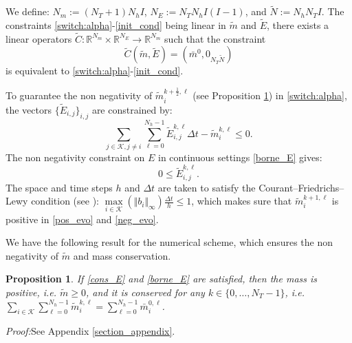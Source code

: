 \documentclass[conference]{IEEEtran}
\newtheorem{proposition}{Proposition}[section]
\def\K{\mathcal{K}}
\begin{document}
We define: $N_m := (N_T+1)N_hI$, $N_E := N_TN_hI(I-1)$, and $\tilde{N}:= N_hN_T I$.
 The constraints \eqref{switch:alpha}-\eqref{init_cond} being linear in $\tilde{m}$ and $\tilde{E}$, there exists a linear operators $\tilde{C}:\mathbb{R}^{N_m}\times \mathbb{R}^{N_E} \to \mathbb{R}^{N_m}$ such that the constraint 
 \begin{equation}
 \label{linear:cons}
 \tilde{C}(\tilde{m},\tilde{E}) = (\bar{m}^{0}, 0_{N_T\tilde{N}})
 \end{equation}
 is equivalent to \eqref{switch:alpha}-\eqref{init_cond}.

 To guarantee the non negativity of $\tilde{m}_i^{k+\frac{1}{2},\ell}$ (see Proposition \ref{prop_num_schemm})  in \eqref{switch:alpha}, the vectors $\{\tilde{E}_{i,j}\}_{i,j}$ are constrained by:
 \begin{equation}
 \label{cons_E}
 \sum_{j\in\K ,j\neq i}\sum_{\ell =0}^{N_h-1}\tilde{E}^{k,\ell}_{i,j}\Delta t-\tilde{m}^{k,\ell}_{i}\leq 0.
 \end{equation}
 The non negativity constraint on $E$ in continuous settings \eqref{borne_E} gives:
 \begin{equation}
 \label{borne_E_dis}
 0\leq \tilde{E}^{k,\ell}_{i,j}.
 \end{equation}
 The space and time steps $h $ and $\Delta t$ are taken to satisfy the  Courant–Friedrichs–Lewy condition  (see \cite{hirsch1990numerical}):
$\textstyle \underset{i\in\K }{\max} (\Vert b_i\Vert_\infty)\frac{\Delta t}{h}\leq 1$, which makes sure that $\tilde{m}_i^{k+1,\ell}$ is positive in \eqref{pos_evo} and \eqref{neg_evo}.

We have the following result for the numerical scheme, which ensures the non negativity of $\tilde{m}$ and mass conservation.

\begin{proposition}\label{prop_num_schemm}
If \eqref{cons_E} and \eqref{borne_E} are satisfied, then the mass is positive, i.e. $\tilde{m}\geq 0$, and it is conserved for any $k\in \{0,\ldots,N_T-1\}$, i.e.  $\textstyle\sum_{i\in \mathcal{K}} \sum_{\ell=0}^{N_h-1}\tilde{m}_i^{k,\ell}=\sum_{\ell=0}^{N_h-1}\bar{m}_i^{0,\ell}$.
\end{proposition}
\textit{Proof:}See Appendix \ref{section_appendix}.
\end{document}
